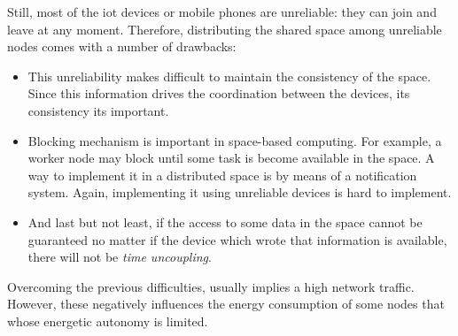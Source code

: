 Still, most of the \ac{iot} devices or mobile phones are unreliable: they can join and leave at any moment.
Therefore, distributing the shared space among unreliable nodes comes with a number of drawbacks:
\begin{itemize}
  \item This unreliability makes difficult to maintain the consistency of the space. %
        Since this information drives the coordination between the devices, its consistency its important.
  \item Blocking mechanism is important in space-based computing.
        For example, a worker node may block until some task is become available in the space.
        A way to implement it in a distributed space is by means of a notification system.
        Again, implementing it using unreliable devices is hard to implement. %
  \item And last but not least, if the access to some data in the space cannot be guaranteed no matter if the device which wrote that information is available, there will not be \emph{time uncoupling}.
\end{itemize}
Overcoming the previous difficulties, usually implies a high network traffic.
However, these negatively influences the energy consumption of some nodes that whose energetic autonomy is limited.







